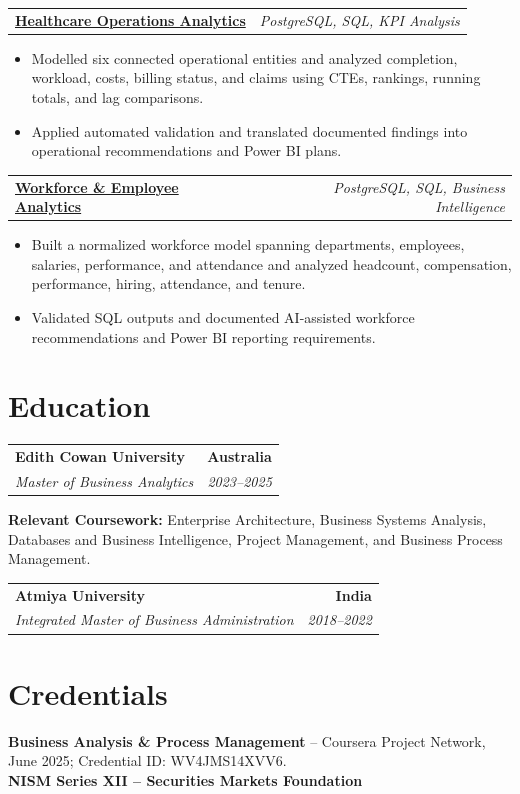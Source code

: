 \documentclass[letterpaper,10pt]{article}
\makeatletter
\newcommand{\role}[4]{%
  \begin{tabularx}{\textwidth}{@{}Xr@{}}
    \textbf{#1} & \textbf{#2} \\
    \textit{#3} & \textit{#4}
  \end{tabularx}\vspace{-1pt}
}
\newcommand{\project}[2]{%
  \begin{tabularx}{\textwidth}{@{}Xr@{}}
    \textbf{#1} & \textit{#2}
  \end{tabularx}\vspace{-1pt}
}
\makeatother
\begin{document}
\project{\href{https://github.com/jainalimehta/Healthcare-Analytics}{Healthcare Operations Analytics}}{PostgreSQL, SQL, KPI Analysis}
\begin{itemize}
  \item Modelled six connected operational entities and analyzed completion, workload, costs, billing status, and claims using CTEs, rankings, running totals, and lag comparisons.
  \item Applied automated validation and translated documented findings into operational recommendations and Power BI plans.
\end{itemize}
\vspace{1pt}

\project{\href{https://github.com/jainalimehta/HR-Analytics}{Workforce \& Employee Analytics}}{PostgreSQL, SQL, Business Intelligence}
\begin{itemize}
  \item Built a normalized workforce model spanning departments, employees, salaries, performance, and attendance and analyzed headcount, compensation, performance, hiring, attendance, and tenure.
  \item Validated SQL outputs and documented AI-assisted workforce recommendations and Power BI reporting requirements.
\end{itemize}

\section{Education}
\role{Edith Cowan University}{Australia}{Master of Business Analytics}{2023--2025}
\small\textbf{Relevant Coursework:} Enterprise Architecture, Business Systems Analysis, Databases and Business Intelligence, Project Management, and Business Process Management.\\[2pt]
\role{Atmiya University}{India}{Integrated Master of Business Administration}{2018--2022}

\section{Credentials}
\small\textbf{Business Analysis \& Process Management} -- Coursera Project Network, June 2025; Credential ID: WV4JMS14XVV6.\\[-0.2pt]
\small\textbf{NISM Series XII -- Securities Markets Foundation}
\end{document}
